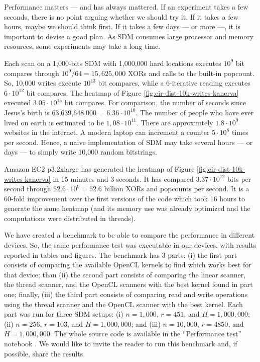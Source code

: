 
Performance matters --- and has always mattered. If an experiment takes a few seconds, there is no point arguing whether we should try it. If it takes a few hours, maybe we should think first. If it takes a few days --- or more ---, it is important to devise a good plan. As SDM consumes large processor and memory resources, some experiments may take a long time.

Each scan on a 1,000-bits SDM with 1,000,000 hard locations executes $10^9$ bit compares through $10^9/64 = 15,625,000$ XORs and calls to the built-in popcount. So, 10,000 writes execute $10^{13}$ bit compares, while a 6-iterative reading executes $6 \cdot 10^{12}$ bit compares. The heatmap of Figure \ref{fig:cir-dist-10k-writes-kanerva} executed $3.05 \cdot 10^{15}$ bit compares. For comparison, the number of seconds since Jesus's birth is 63,639,648,000 = $6.36 \cdot 10^{10}$. The number of people who have ever lived on earth is estimated to be $1,08 \cdot 10^{11}$. There are approximtely $1.8 \cdot 10^{9}$ websites in the internet. A modern laptop can increment a counter $5 \cdot 10^{8}$ times per second. Hence, a naive implementation of SDM may take several hours --- or days --- to simply write 10,000 random bitstrings.

Amazon EC2 p3.2xlarge has generated the heatmap of Figure \ref{fig:cir-dist-10k-writes-kanerva} in 15 minutes and 3 seconds. It has compared $3.37 \cdot 10^{12}$ bits per second through $52.6 \cdot 10^{9} = 52.6 \text{ billion}$ XORs and popcounts per second. It is a 60-fold improvement over the first versions of the code which took 16 hours to generate the same heatmap (and its memory use was already optimized and the computations were distributed in threads).

We have created a benchmark to be able to compare the performance in different devices. So, the same performance test was executable in our devices, with results reported in tables and figures. The benchmark has 3 parts: (i) the first part consists of comparing the available OpenCL kernels to find which works best for that device; than (ii) the second part consists of comparing the linear scanner, the thread scanner, and the OpenCL scanners with the best kernel found in part one; finally, (iii) the third part consists of comparing read and write operations using the thread scanner and the OpenCL scanner with the best kernel. Each part was run for three SDM setups: (i) $n=1,000$, $r=451$, and $H=1,000,000$; (ii) $n=256$, $r=103$, and $H=1,000,000$; and (iii) $n=10,000$, $r=4850$, and $H=1,000,000$. The whole source code is available in the ``Performance test'' notebook \citep{sdmframework}. We would like to invite the reader to run this benchmark and, if possible, share the results.


